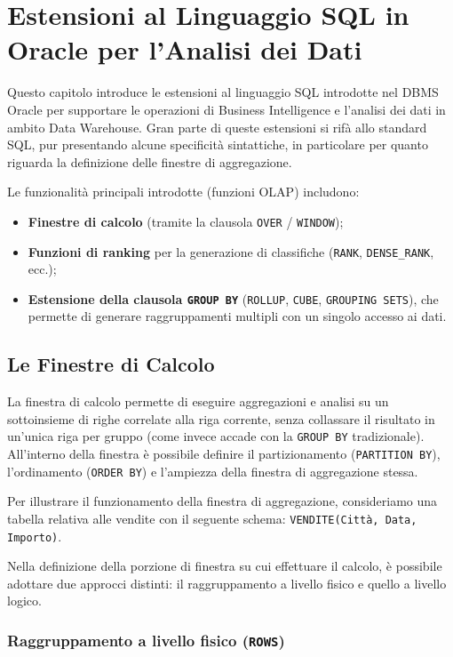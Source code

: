 \chapter{Estensioni al Linguaggio SQL in Oracle per l'Analisi dei Dati}

Questo capitolo introduce le estensioni al linguaggio SQL introdotte nel DBMS Oracle per supportare le operazioni di Business Intelligence e l'analisi dei dati in ambito Data Warehouse. Gran parte di queste estensioni si rifà allo standard SQL, pur presentando alcune specificità sintattiche, in particolare per quanto riguarda la definizione delle finestre di aggregazione.

Le funzionalità principali introdotte (funzioni OLAP) includono:
\begin{itemize}
    \item \textbf{Finestre di calcolo} (tramite la clausola \texttt{OVER} / \texttt{WINDOW});
    \item \textbf{Funzioni di ranking} per la generazione di classifiche (\texttt{RANK}, \texttt{DENSE\_RANK}, ecc.);
    \item \textbf{Estensione della clausola \texttt{GROUP BY}} (\texttt{ROLLUP}, \texttt{CUBE}, \texttt{GROUPING SETS}), che permette di generare raggruppamenti multipli con un singolo accesso ai dati.
\end{itemize}

\section{Le Finestre di Calcolo}

La finestra di calcolo permette di eseguire aggregazioni e analisi su un sottoinsieme di righe correlate alla riga corrente, senza collassare il risultato in un'unica riga per gruppo (come invece accade con la \texttt{GROUP BY} tradizionale). 
All'interno della finestra è possibile definire il partizionamento (\texttt{PARTITION BY}), l'ordinamento (\texttt{ORDER BY}) e l'ampiezza della finestra di aggregazione stessa.

Per illustrare il funzionamento della finestra di aggregazione, consideriamo una tabella relativa alle vendite con il seguente schema:
\texttt{VENDITE(Città, Data, Importo)}.

Nella definizione della porzione di finestra su cui effettuare il calcolo, è possibile adottare due approcci distinti: il raggruppamento a livello fisico e quello a livello logico.

\subsection{Raggruppamento a livello fisico (\texttt{ROWS})}

